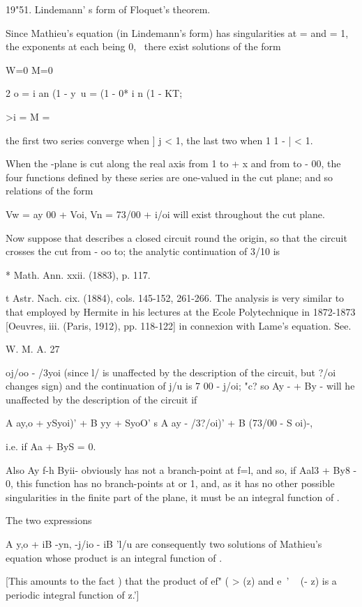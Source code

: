 19"51. Lindemann' s form of Floquet's theorem.

Since Mathieu's equation (in Lindemann's form) has singularities at =
and = 1, the exponents at each being 0, \, there exist solutions of
the form

W=0 M=0

2 o = i an (1 - y\ u = (1 - 0* i n (1 - KT;

>i = M =

the first two series converge when ] j < 1, the last two when 1 1 - |
< 1.

When the -plane is cut along the real axis from 1 to + x and from to -
00, the four functions defined by these series are one-valued in the
cut plane; and so relations of the form

Vw = ay 00 + Voi, Vn = 73/00 + i/oi will exist throughout the cut
plane.

Now suppose that describes a closed circuit round the origin, so that
the circuit crosses the cut from - oo to; the analytic continuation
of 3/10 is

* Math. Ann. xxii. (1883), p. 117.

t Astr. Nach. cix. (1884), cols. 145-152, 261-266. The analysis is
very similar to that employed by Hermite in his lectures at the Ecole
Polytechnique in 1872-1873 [Oeuvres, iii. (Paris, 1912), pp. 118-122]
in connexion with Lame's equation. See.

W. M. A. 27

%
%

oj/oo - /3yoi (since l/ is unaffected by the description of the
circuit, but ?/oi changes sign) and the continuation of j/u is 7 00 -
j/oi; "c? so Ay - + By - will he unaffected by the description of the
circuit if

A ay,o + ySyoi)' + B yy + SyoO' s A ay - /3?/oi)' + B (73/00 - S oi)-,

i.e. if Aa + ByS = 0.

Also Ay f-h Byii- obviously has not a branch-point at f=l, and so, if
Aal3 + By8 - 0, this function has no branch-points at or 1, and, as it
has no other possible singularities in the finite part of the plane,
it must be an integral function of .

The two expressions

A y,o + iB -yn, -j/io - iB 'l/u are consequently two solutions of
Mathieu's equation whose product is an integral function of .

[This amounts to the fact ) that the product of ef" ( > (z) and
e~' ~ (- z) is a periodic integral function of z.']

